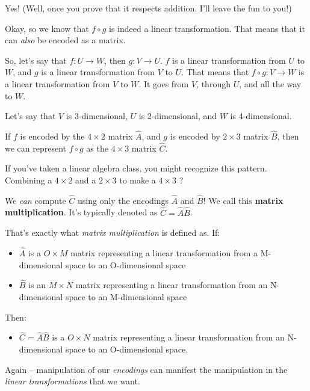 \documentclass[]{article}
\begin{document}
Yes! (Well, once you prove that it respects addition. I'll leave the fun to
you!)

Okay, so we know that \(f \circ g\) is indeed a linear transformation. That
means that it can \emph{also} be encoded as a matrix.

So, let's say that \(f : U \rightarrow W\), then \(g : V \rightarrow U\). \(f\)
is a linear transformation from \(U\) to \(W\), and \(g\) is a linear
transformation from \(V\) to \(U\). That means that
\(f \circ g : V \rightarrow W\) is a linear transformation from \(V\) to \(W\).
It goes from \(V\), through \(U\), and all the way to \(W\).

Let's say that \(V\) is 3-dimensional, \(U\) is 2-dimensional, and \(W\) is
4-dimensional.

If \(f\) is encoded by the \(4 \times 2\) matrix \(\hat{A}\), and \(g\) is
encoded by \(2 \times 3\) matrix \(\hat{B}\), then we can represent
\(f \circ g\) as the \(4
\times 3\) matrix \(\hat{C}\).

If you've taken a linear algebra class, you might recognize this pattern.
Combining a \(4 \times 2\) and a \(2 \times 3\) to make a \(4 \times 3\) ?

We \emph{can} compute \(\hat{C}\) using only the encodings \(\hat{A}\) and
\(\hat{B}\)! We call this \textbf{matrix multiplication}. It's typically denoted
as \(\hat{C} =
\hat{A} \hat{B}\).

That's exactly what \emph{matrix multiplication} is defined as. If:

\begin{itemize}
\tightlist
\item
  \(\hat{A}\) is a \(O \times M\) matrix representing a linear transformation
  from a M-dimensional space to an O-dimensional space
\item
  \(\hat{B}\) is an \(M \times N\) matrix representing a linear transformation
  from an N-dimensional space to an M-dimensional space
\end{itemize}

Then:

\begin{itemize}
\tightlist
\item
  \(\hat{C} = \hat{A}\hat{B}\) is a \(O \times N\) matrix representing a linear
  transformation from an N-dimensional space to an O-dimensional space.
\end{itemize}

Again -- manipulation of our \emph{encodings} can manifest the manipulation in
the \emph{linear transformations} that we want.
\end{document}
